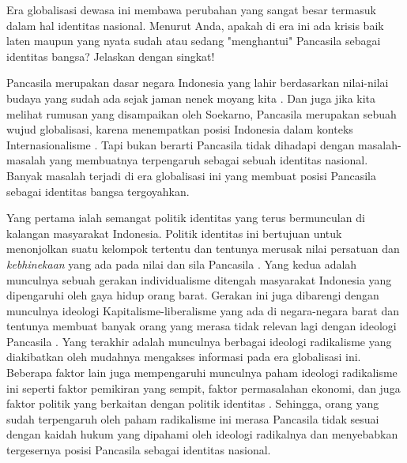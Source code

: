 \documentclass[
  12pt,
  answers  
]{exam}
\begin{document}
\begin{questions}
      \question
      Era globalisasi dewasa ini membawa perubahan yang sangat besar termasuk dalam hal identitas nasional. Menurut Anda, apakah di era ini ada krisis baik laten maupun yang nyata sudah atau sedang "menghantui" Pancasila sebagai identitas bangsa? Jelaskan dengan singkat!
      \begin{solution}
        Pancasila merupakan dasar negara Indonesia yang lahir berdasarkan nilai-nilai budaya yang sudah ada sejak jaman nenek moyang kita \cite{pujiasmaroiniMENJAGAEKSISTENSIPANCASILA2017}. Dan juga jika kita melihat rumusan yang disampaikan oleh Soekarno, Pancasila merupakan sebuah wujud globalisasi, karena menempatkan posisi Indonesia dalam konteks Internasionalisme \cite[p.~74]{boloPancasilaDalamPendidikan2020}. Tapi bukan berarti Pancasila tidak dihadapi dengan masalah-masalah yang membuatnya terpengaruh sebagai sebuah identitas nasional. Banyak masalah terjadi di era globalisasi ini yang membuat posisi Pancasila sebagai identitas bangsa tergoyahkan.
        
        Yang pertama ialah semangat politik identitas yang terus bermunculan di kalangan masyarakat Indonesia. Politik identitas ini bertujuan untuk menonjolkan suatu kelompok tertentu dan tentunya merusak nilai persatuan dan \emph{kebhinekaan} yang ada pada nilai dan sila Pancasila \cite{situruPancasilaDanTantangan2019}. Yang kedua adalah munculnya sebuah gerakan individualisme ditengah masyarakat Indonesia yang dipengaruhi oleh gaya hidup orang barat. Gerakan ini juga dibarengi dengan munculnya ideologi Kapitalisme-liberalisme yang ada di negara-negara barat dan tentunya membuat banyak orang yang merasa tidak relevan lagi dengan ideologi Pancasila \cite{rosyidinpenguatan}. Yang terakhir adalah munculnya berbagai ideologi radikalisme yang diakibatkan oleh mudahnya mengakses informasi pada era globalisasi ini. Beberapa faktor lain juga mempengaruhi munculnya paham ideologi radikalisme ini seperti faktor pemikiran yang sempit, faktor permasalahan ekonomi, dan juga faktor politik yang berkaitan dengan politik identitas \cite{mediaFaktorPenyebabMunculnya2021}. Sehingga, orang yang sudah terpengaruh oleh paham radikalisme ini merasa Pancasila tidak sesuai dengan kaidah hukum yang dipahami oleh ideologi radikalnya dan menyebabkan tergesernya posisi Pancasila sebagai identitas nasional.


      \end{solution}


\end{questions}
\end{document}
